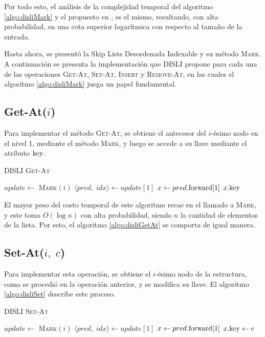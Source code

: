 \documentclass[a4paper,10pt,twocolumn]{article}
\newcommand{\la}{\leftarrow}
\newcommand{\fwd}[1]{{\rm forward}[#1]}
\newcommand{\key}{{\rm key}}
\begin{document}
  Por todo esto, el análisis de la complejidad temporal del algoritmo \ref{algo:disliMark} y el propuesto en \cite{Pugh}, es el mismo, resultando, con alta probabilidad, en una cota superior logarítmica con respecto al tamaño de la entrada.
  
  Hasta ahora, se presentó la Skip Lists Desordenada Indexable y su método \textsc{Mark}. A continuación se presenta la implementación que DISLI propone para cada una de las operaciones \textsc{Get-At, Set-At, Insert} y \textsc{Remove-At}, en las cuales el algoritmo \ref{algo:disliMark} juega un papel fundamental.
  
\subsection{Get-At($ i $)}\label{subsec:disliGet}
  Para implementar el método \textsc{Get-At}, se obtiene el antecesor del $ i $-ésimo nodo en el nivel 1, mediante el método \textsc{Mark}, y luego se accede a su llave mediante el atributo $ \key $.
  \begin{algorithm}[htb]\label{algo:disliGetAt}
  	\caption{DISLI \textsc{Get-At}}
  	
  	\SetAlgoLined
  	
  	
  	\LinesNumbered
  	\SetAlgoVlined
  	
  	$ update \la $ \textsc{Mark}$ (i) $\;
  	$ \langle pred, \; idx \rangle \la update[1] $\;
  	$ x \la pred . \fwd{1} $\;
  	\Return $ x . \key $\;
  \end{algorithm}

  El mayor peso del costo temporal de este algoritmo recae en el llamado a \textsc{Mark}, y este toma $ O(\log n) $ con alta probabilidad, siendo $ n $ la cantidad de elementos de la lista. Por esto, el algoritmo \ref{algo:disliGetAt} se comporta de igual manera.
  
\subsection{Set-At($ i,\; c $)}\label{subsec:disliSet}
  Para implementar esta operación, se obtiene el $ i $-ésimo nodo de la estructura, como se procedió en la operación anterior, y se modifica su llave. El algoritmo \ref{algo:disliSet} describe este proceso.
  \begin{algorithm}[htb]\label{algo:disliSet}
  	\caption{DISLI \textsc{Set-At}}
  	
  	\SetAlgoLined
  	
  	
  	\LinesNumbered
  	\SetAlgoVlined
  	
  	$ update \la $ \textsc{Mark}$ (i) $\;
  	$ \langle pred, \; idx \rangle \la update[1] $\;
  	$ x \la pred . \fwd{1} $\;
  	$ x . \key \la c $\;
  \end{algorithm}
\end{document}
